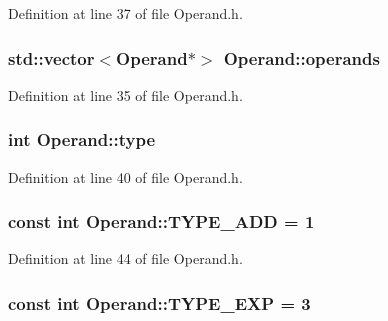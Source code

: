 Definition at line 37 of file Operand.\+h.

\hypertarget{class_operand_a7939bfe67bad92030551774aed8a1b77}{
\subsubsection[{operands}]{\setlength{\rightskip}{0pt plus 5cm}std\+::vector$<${\bf Operand}$\ast$$>$ Operand\+::operands\hspace{0.3cm}{\ttfamily [protected]}}}\label{class_operand_a7939bfe67bad92030551774aed8a1b77}


Definition at line 35 of file Operand.\+h.

\hypertarget{class_operand_a389bb640b257a1fc4ed658a1817591c6}{
\subsubsection[{type}]{\setlength{\rightskip}{0pt plus 5cm}int Operand\+::type\hspace{0.3cm}{\ttfamily [protected]}}}\label{class_operand_a389bb640b257a1fc4ed658a1817591c6}


Definition at line 40 of file Operand.\+h.

\hypertarget{class_operand_a72561b58147e35a5a359d9b79118dbb0}{
\subsubsection[{T\+Y\+P\+E\+\_\+\+A\+D\+D}]{\setlength{\rightskip}{0pt plus 5cm}const int Operand\+::\+T\+Y\+P\+E\+\_\+\+A\+D\+D = 1\hspace{0.3cm}{\ttfamily [static]}}}\label{class_operand_a72561b58147e35a5a359d9b79118dbb0}


Definition at line 44 of file Operand.\+h.

\hypertarget{class_operand_a16ab8a1b33c8e8a2f576a9027f7f2d21}{
\subsubsection[{T\+Y\+P\+E\+\_\+\+E\+X\+P}]{\setlength{\rightskip}{0pt plus 5cm}const int Operand\+::\+T\+Y\+P\+E\+\_\+\+E\+X\+P = 3\hspace{0.3cm}{\ttfamily [static]}}}\label{class_operand_a16ab8a1b33c8e8a2f576a9027f7f2d21}


